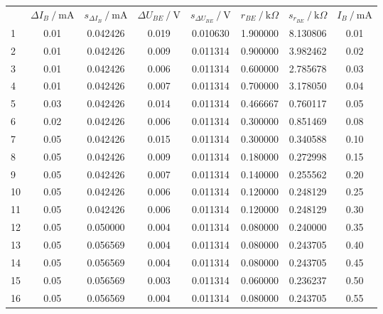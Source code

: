 \begin{center}
    \begin{tabular}{gcccc|ccc}
          &  $\Delta I_{B}~/~\text{mA}$ &   $s_{\Delta I_{B}}~/~\text{mA}$ & $\Delta U_{BE}~/~\text{V}$ &   $s_{\Delta U_{BE}}~/~\text{V}$ &     $r_{BE}~/~\text{k} \Omega$ &   $s_{r_{BE}}~/~\text{k} \Omega$ & $I_B~/~\text{mA}$ \\     
        1  &     0.01 &     0.042426 &     0.019 &      0.010630 &  1.900000 &  8.130806 &  0.01 \\
        2  &     0.01 &     0.042426 &     0.009 &      0.011314 &  0.900000 &  3.982462 &  0.02 \\
        3  &     0.01 &     0.042426 &     0.006 &      0.011314 &  0.600000 &  2.785678 &  0.03 \\
        4  &     0.01 &     0.042426 &     0.007 &      0.011314 &  0.700000 &  3.178050 &  0.04 \\
        5  &     0.03 &     0.042426 &     0.014 &      0.011314 &  0.466667 &  0.760117 &  0.05 \\
        6  &     0.02 &     0.042426 &     0.006 &      0.011314 &  0.300000 &  0.851469 &  0.08 \\
        7  &     0.05 &     0.042426 &     0.015 &      0.011314 &  0.300000 &  0.340588 &  0.10 \\
        8  &     0.05 &     0.042426 &     0.009 &      0.011314 &  0.180000 &  0.272998 &  0.15 \\
        9  &     0.05 &     0.042426 &     0.007 &      0.011314 &  0.140000 &  0.255562 &  0.20 \\
        10 &     0.05 &     0.042426 &     0.006 &      0.011314 &  0.120000 &  0.248129 &  0.25 \\
        11 &     0.05 &     0.042426 &     0.006 &      0.011314 &  0.120000 &  0.248129 &  0.30 \\
        12 &     0.05 &     0.050000 &     0.004 &      0.011314 &  0.080000 &  0.240000 &  0.35 \\
        13 &     0.05 &     0.056569 &     0.004 &      0.011314 &  0.080000 &  0.243705 &  0.40 \\
        14 &     0.05 &     0.056569 &     0.004 &      0.011314 &  0.080000 &  0.243705 &  0.45 \\
        15 &     0.05 &     0.056569 &     0.003 &      0.011314 &  0.060000 &  0.236237 &  0.50 \\
        16 &     0.05 &     0.056569 &     0.004 &      0.011314 &  0.080000 &  0.243705 &  0.55 \\

\end{tabular}
\end{center}

